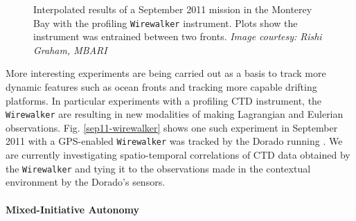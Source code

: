 \begin{figure}
\caption{\small Interpolated results of a September 2011 \rx mission
  in the Monterey Bay with the profiling \texttt{Wirewalker}
  \cite{rainville01,pinkel11} instrument. Plots show the instrument
  was entrained between two fronts. \emph{Image courtesy: Rishi
    Graham, MBARI}}
  \label{fig:sept11-wirewalker}
\end{figure}

More interesting experiments are being carried out as a basis to track
more dynamic features such as ocean fronts \cite{fronts11} and
tracking more capable drifting platforms. In particular experiments
with a profiling CTD instrument, the \texttt{Wirewalker}
\cite{rainville01,pinkel11} are resulting in new modalities of making
Lagrangian and Eulerian observations. Fig. \ref{sep11-wirewalker}
shows one such experiment in September 2011 with a GPS-enabled
\texttt{Wirewalker} was tracked by the Dorado running \rx. We are
currently investigating spatio-temporal correlations \cite{gneiting07}
of CTD data obtained by the \texttt{Wirewalker} and tying it to the
observations made in the contextual environment by the Dorado's
sensors.

\paragraph {Mixed-Initiative Autonomy}

